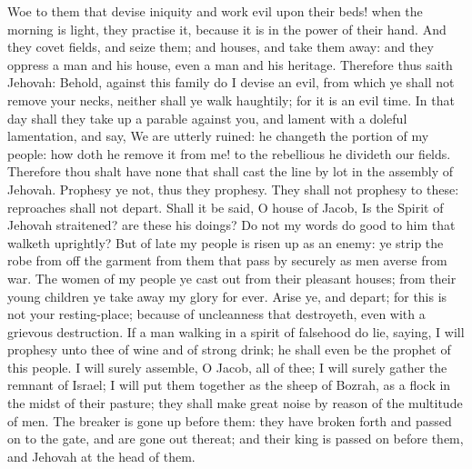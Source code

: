 Woe to them that devise iniquity and work evil upon their beds! when the morning is light, they practise it, because it is in the power of their hand. And they covet fields, and seize them; and houses, and take them away: and they oppress a man and his house, even a man and his heritage. Therefore thus saith Jehovah: Behold, against this family do I devise an evil, from which ye shall not remove your necks, neither shall ye walk haughtily; for it is an evil time. In that day shall they take up a parable against you, and lament with a doleful lamentation, and say, We are utterly ruined: he changeth the portion of my people: how doth he remove it from me! to the rebellious he divideth our fields. Therefore thou shalt have none that shall cast the line by lot in the assembly of Jehovah.  Prophesy ye not, thus they prophesy. They shall not prophesy to these: reproaches shall not depart. Shall it be said, O house of Jacob, Is the Spirit of Jehovah straitened? are these his doings? Do not my words do good to him that walketh uprightly? But of late my people is risen up as an enemy: ye strip the robe from off the garment from them that pass by securely as men averse from war. The women of my people ye cast out from their pleasant houses; from their young children ye take away my glory for ever. Arise ye, and depart; for this is not your resting-place; because of uncleanness that destroyeth, even with a grievous destruction. If a man walking in a spirit of falsehood do lie, saying, I will prophesy unto thee of wine and of strong drink; he shall even be the prophet of this people.  I will surely assemble, O Jacob, all of thee; I will surely gather the remnant of Israel; I will put them together as the sheep of Bozrah, as a flock in the midst of their pasture; they shall make great noise by reason of the multitude of men. The breaker is gone up before them: they have broken forth and passed on to the gate, and are gone out thereat; and their king is passed on before them, and Jehovah at the head of them. 


